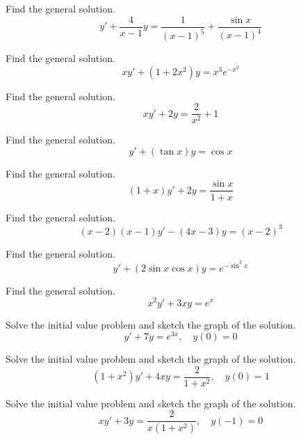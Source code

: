 \documentclass{ximera}
\begin{document}
\begin{problem}\label{exer:2.1.17} Find the general solution.
$$y'+\frac{4}{x-1}y= \frac{1}{(x-1)^5}+\frac{\sin x}{(x-1)^4}$$
\end{problem}

\begin{problem}\label{exer:2.1.18} Find the general solution.
$$xy'+(1+2x^2)y=x^3e^{-x^2}$$
\end{problem}

\begin{problem}\label{exer:2.1.19} Find the general solution.
$$xy'+2y=\frac{2}{x^2}+1$$
\end{problem}

\begin{problem}\label{exer:2.1.20} Find the general solution.
$$y'+(\tan x)y=\cos x$$
\end{problem}

\begin{problem}\label{exer:2.1.21} Find the general solution.
$$(1+x)y'+2y=\frac{\sin x}{1 + x}$$
\end{problem}

\begin{problem}\label{exer:2.1.22} Find the general solution.
$$(x-2)(x-1)y'-(4x-3)y=(x-2)^3$$
\end{problem}

\begin{problem}\label{exer:2.1.23} Find the general solution.
$$y'+(2\sin x\cos x) y=e^{-\sin^2x}$$
\end{problem}

\begin{problem}\label{exer:2.1.24} Find the general solution.
$$x^2y'+3xy=e^x$$
\end{problem}

\begin{problem}\label{exer:2.1.25} Solve the
initial value problem and sketch the graph of the solution.
$$y'+7y=e^{3x},\quad y(0)=0$$
\end{problem}

\begin{problem}\label{exer:2.1.26} Solve the
initial value problem and sketch the graph of the solution.
$$(1+x^2)y'+4xy=\frac{2}{1+x^2},\quad y(0)=1$$
\end{problem}

\begin{problem}\label{exer:2.1.27} Solve the
initial value problem and sketch the graph of the solution.
$$xy'+3y=\frac{2}{x(1+x^2)},\quad y(-1)=0$$
\end{problem}
\end{document}
